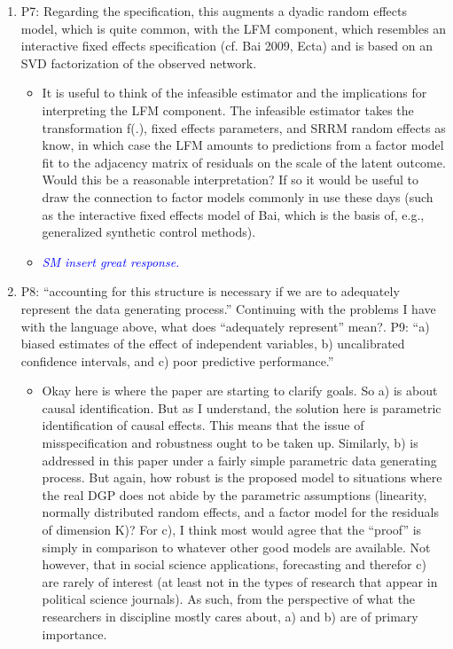 \begin{enumerate}
\begin{itemize}
\end{itemize}
	\item P7: Regarding the specification, this augments a dyadic random effects model, which is quite common, with  the LFM component, which resembles an interactive fixed effects specification (cf. Bai 2009, Ecta) and is based on an SVD factorization of the observed network.
	\begin{itemize}
		\item It is useful to think of the infeasible estimator and the implications for interpreting the LFM component.  The infeasible estimator takes the transformation f(.), fixed effects parameters, and SRRM random effects as know, in which case the LFM amounts to predictions from a factor model fit to the adjacency matrix of residuals on the scale of the latent outcome.  Would this be a reasonable interpretation? If so it would be useful to draw the connection to factor models commonly in use these days (such as the interactive fixed effects model of Bai, which is the basis of, e.g., generalized synthetic control methods).
	\end{itemize}
	\begin{itemize}
		\item \textcolor{blue}{ \emph{
		SM insert great response. 
		}}
	\end{itemize}
	\item P8: “accounting for this structure is necessary if we are to adequately represent the data generating process.” Continuing with the problems I have with the language above, what does “adequately represent” mean?. P9: “a) biased estimates of the effect of independent variables, b) uncalibrated confidence intervals, and c) poor predictive performance.”
	\begin{itemize}
		\item Okay here is where the paper are starting to clarify goals.  So a) is about causal identification.  But as I understand, the solution here is parametric identification of causal effects.  This means that the issue of misspecification and robustness ought to be taken up.  Similarly, b) is addressed in this paper under a fairly simple parametric data generating process. But again, how robust is the proposed model to situations where the real DGP does not abide by the parametric assumptions (linearity, normally distributed random effects, and a factor model for the residuals of dimension K)? For c), I think most would agree that the “proof” is simply in comparison to whatever other good models are available.  Not however, that in social science applications, forecasting and therefor c) are rarely of interest (at least not in the types of research that appear in political science journals).  As such, from the perspective of what the researchers in discipline mostly cares about, a) and b) are of primary importance.

\end{itemize}
\end{enumerate}
